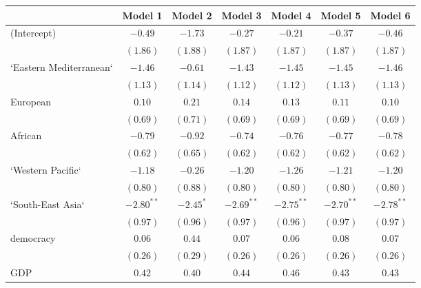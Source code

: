 
\begin{table}[!h]
\begin{center}
\begin{tabular}{l c c c c c c }
\toprule
 & Model 1 & Model 2 & Model 3 & Model 4 & Model 5 & Model 6 \\
\midrule
(Intercept)             & $-0.49$      & $-1.73$      & $-0.27$      & $-0.21$      & $-0.37$      & $-0.46$      \\
                        & $(1.86)$     & $(1.88)$     & $(1.87)$     & $(1.87)$     & $(1.87)$     & $(1.87)$     \\
`Eastern Mediterranean` & $-1.46$      & $-0.61$      & $-1.43$      & $-1.45$      & $-1.45$      & $-1.46$      \\
                        & $(1.13)$     & $(1.14)$     & $(1.12)$     & $(1.12)$     & $(1.13)$     & $(1.13)$     \\
European                & $0.10$       & $0.21$       & $0.14$       & $0.13$       & $0.11$       & $0.10$       \\
                        & $(0.69)$     & $(0.71)$     & $(0.69)$     & $(0.69)$     & $(0.69)$     & $(0.69)$     \\
African                 & $-0.79$      & $-0.92$      & $-0.74$      & $-0.76$      & $-0.77$      & $-0.78$      \\
                        & $(0.62)$     & $(0.65)$     & $(0.62)$     & $(0.62)$     & $(0.62)$     & $(0.62)$     \\
`Western Pacific`       & $-1.18$      & $-0.26$      & $-1.20$      & $-1.26$      & $-1.21$      & $-1.20$      \\
                        & $(0.80)$     & $(0.88)$     & $(0.80)$     & $(0.80)$     & $(0.80)$     & $(0.80)$     \\
`South-East Asia`       & $-2.80^{**}$ & $-2.45^{*}$  & $-2.69^{**}$ & $-2.75^{**}$ & $-2.70^{**}$ & $-2.78^{**}$ \\
                        & $(0.97)$     & $(0.96)$     & $(0.97)$     & $(0.96)$     & $(0.97)$     & $(0.97)$     \\
democracy               & $0.06$       & $0.44$       & $0.07$       & $0.06$       & $0.08$       & $0.07$       \\
                        & $(0.26)$     & $(0.29)$     & $(0.26)$     & $(0.26)$     & $(0.26)$     & $(0.26)$     \\
GDP                     & $0.42$       & $0.40$       & $0.44$       & $0.46$       & $0.43$       & $0.43$       \\

\end{tabular}
\end{center}
\end{table}
